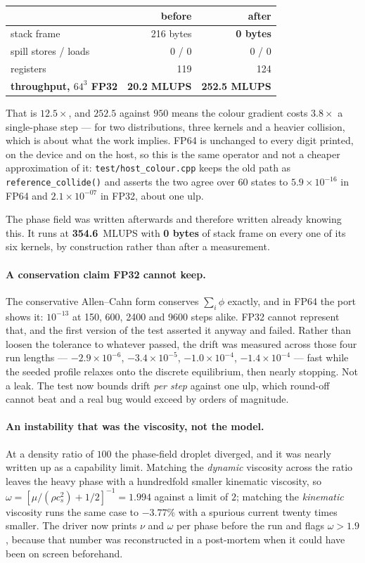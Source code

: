 \documentclass[11pt,a4paper]{article}
\newcommand{\code}[1]{\texttt{\small #1}}
\newcommand{\cs}{c_s}
\newcommand{\e}[1]{\times 10^{#1}}
\begin{document}
\begin{center}
\begin{tabular}{lrr}
\toprule
 & before & after \\
\midrule
stack frame & 216 bytes & \textbf{0 bytes} \\
spill stores / loads & 0 / 0 & 0 / 0 \\
registers & 119 & 124 \\
\textbf{throughput, $64^3$ FP32} & \textbf{20.2 MLUPS} & \textbf{252.5 MLUPS} \\
\bottomrule
\end{tabular}
\end{center}

That is $12.5\times$, and $252.5$ against $950$ means the colour gradient costs
$3.8\times$ a single-phase step --- for two distributions, three kernels and a
heavier collision, which is about what the work implies. FP64 is unchanged to
every digit printed, on the device and on the host, so this is the same operator
and not a cheaper approximation of it: \code{test/host\_colour.cpp} keeps the old
path as \code{reference\_collide()} and asserts the two agree over 60 states to
$5.9\e{-16}$ in FP64 and $2.1\e{-07}$ in FP32, about one ulp.

The phase field was written afterwards and therefore written already knowing
this. It runs at \textbf{354.6}~MLUPS with \textbf{0 bytes} of stack frame on
every one of its six kernels, by construction rather than after a measurement.

\paragraph{A conservation claim FP32 cannot keep.} The conservative
Allen--Cahn form conserves $\sum_i \phi$ exactly, and in FP64 the port shows it:
$10^{-13}$ at 150, 600, 2400 and 9600 steps alike. FP32 cannot represent that,
and the first version of the test asserted it anyway and failed. Rather than
loosen the tolerance to whatever passed, the drift was measured across those
four run lengths --- $-2.9\e{-6}$, $-3.4\e{-5}$, $-1.0\e{-4}$, $-1.4\e{-4}$ ---
fast while the seeded profile relaxes onto the discrete equilibrium, then nearly
stopping. Not a leak. The test now bounds drift \emph{per step} against one ulp,
which round-off cannot beat and a real bug would exceed by orders of magnitude.

\paragraph{An instability that was the viscosity, not the model.} At a density
ratio of $100$ the phase-field droplet diverged, and it was nearly written up as
a capability limit. Matching the \emph{dynamic} viscosity across the ratio
leaves the heavy phase with a hundredfold smaller kinematic viscosity, so
$\omega = [\mu/(\rho\cs^2) + 1/2]^{-1} = 1.994$ against a limit of $2$; matching
the \emph{kinematic} viscosity runs the same case to $-3.77\%$ with a spurious
current twenty times smaller. The driver now prints $\nu$ and $\omega$ per phase
before the run and flags $\omega > 1.9$, because that number was reconstructed
in a post-mortem when it could have been on screen beforehand.
\end{document}
